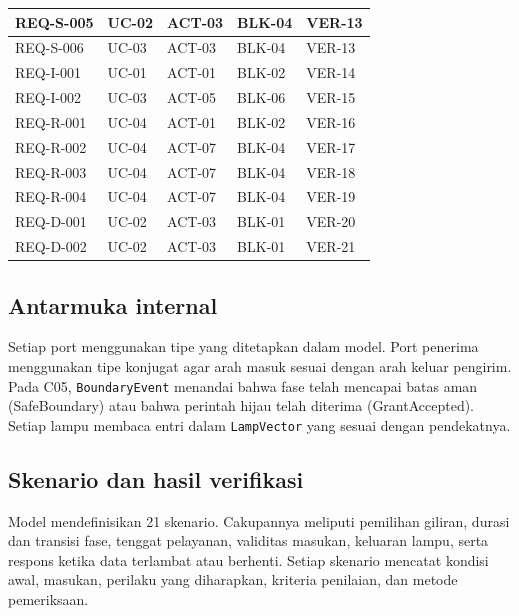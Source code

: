 \begin{longtable}{|l|l|l|l|l|}
REQ-S-005 & UC-02 & ACT-03 & BLK-04 & VER-13 \\ \hline
REQ-S-006 & UC-03 & ACT-03 & BLK-04 & VER-13 \\ \hline
REQ-I-001 & UC-01 & ACT-01 & BLK-02 & VER-14 \\ \hline
REQ-I-002 & UC-03 & ACT-05 & BLK-06 & VER-15 \\ \hline
REQ-R-001 & UC-04 & ACT-01 & BLK-02 & VER-16 \\ \hline
REQ-R-002 & UC-04 & ACT-07 & BLK-04 & VER-17 \\ \hline
REQ-R-003 & UC-04 & ACT-07 & BLK-04 & VER-18 \\ \hline
REQ-R-004 & UC-04 & ACT-07 & BLK-04 & VER-19 \\ \hline
REQ-D-001 & UC-02 & ACT-03 & BLK-01 & VER-20 \\ \hline
REQ-D-002 & UC-02 & ACT-03 & BLK-01 & VER-21 \\ \hline
\end{longtable}

\subsection{Antarmuka internal}
Setiap port menggunakan tipe yang ditetapkan dalam model. Port penerima menggunakan tipe konjugat agar arah masuk sesuai dengan arah keluar pengirim. Pada C05, \texttt{BoundaryEvent} menandai bahwa fase telah mencapai batas aman (SafeBoundary) atau bahwa perintah hijau telah diterima (GrantAccepted). Setiap lampu membaca entri dalam \texttt{LampVector} yang sesuai dengan pendekatnya.

\subsection{Skenario dan hasil verifikasi}
Model mendefinisikan 21 skenario. Cakupannya meliputi pemilihan giliran, durasi dan transisi fase, tenggat pelayanan, validitas masukan, keluaran lampu, serta respons ketika data terlambat atau berhenti. Setiap skenario mencatat kondisi awal, masukan, perilaku yang diharapkan, kriteria penilaian, dan metode pemeriksaan.

